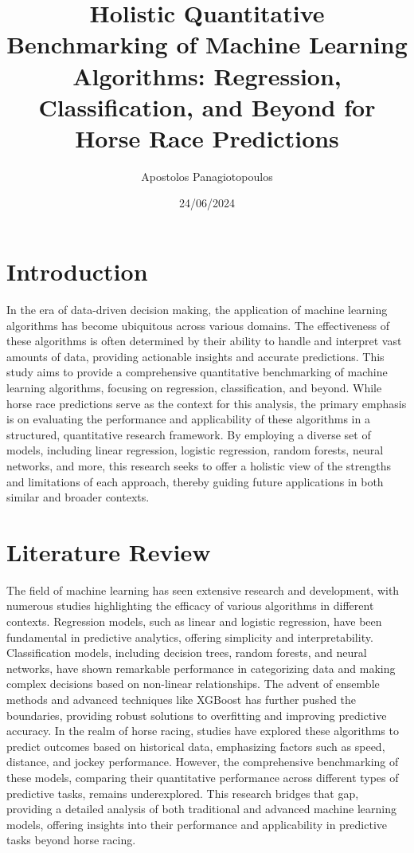 \documentclass{article}
\title{Holistic Quantitative Benchmarking of Machine Learning Algorithms: Regression, Classification, and Beyond for Horse Race Predictions}
\author{Apostolos Panagiotopoulos}
\date{24/06/2024}
\begin{document}
\maketitle

\section*{Introduction}
In the era of data-driven decision making, the application of machine learning algorithms has become ubiquitous across various domains. The effectiveness of these algorithms is often determined by their ability to handle and interpret vast amounts of data, providing actionable insights and accurate predictions. This study aims to provide a comprehensive quantitative benchmarking of machine learning algorithms, focusing on regression, classification, and beyond. While horse race predictions serve as the context for this analysis, the primary emphasis is on evaluating the performance and applicability of these algorithms in a structured, quantitative research framework. By employing a diverse set of models, including linear regression, logistic regression, random forests, neural networks, and more, this research seeks to offer a holistic view of the strengths and limitations of each approach, thereby guiding future applications in both similar and broader contexts.

\section*{Literature Review}
The field of machine learning has seen extensive research and development, with numerous studies highlighting the efficacy of various algorithms in different contexts. Regression models, such as linear and logistic regression, have been fundamental in predictive analytics, offering simplicity and interpretability. Classification models, including decision trees, random forests, and neural networks, have shown remarkable performance in categorizing data and making complex decisions based on non-linear relationships. The advent of ensemble methods and advanced techniques like XGBoost has further pushed the boundaries, providing robust solutions to overfitting and improving predictive accuracy. In the realm of horse racing, studies have explored these algorithms to predict outcomes based on historical data, emphasizing factors such as speed, distance, and jockey performance. However, the comprehensive benchmarking of these models, comparing their quantitative performance across different types of predictive tasks, remains underexplored. This research bridges that gap, providing a detailed analysis of both traditional and advanced machine learning models, offering insights into their performance and applicability in predictive tasks beyond horse racing.
\end{document}
